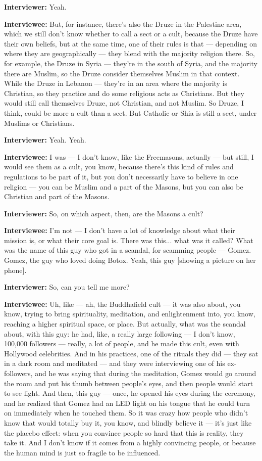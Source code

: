 \textbf{Interviewer:} Yeah.

\textbf{Interviewee:} But, for instance, there's also the Druze in the Palestine area, which we still don't know whether to call a sect or a cult, because the Druze have their own beliefs, but at the same time, one of their rules is that — depending on where they are geographically — they blend with the majority religion there. So, for example, the Druze in Syria — they're in the south of Syria, and the majority there are Muslim, so the Druze consider themselves Muslim in that context. While the Druze in Lebanon — they're in an area where the majority is Christian, so they practice and do some religious acts as Christians. But they would still call themselves Druze, not Christian, and not Muslim. So Druze, I think, could be more a cult than a sect. But Catholic or Shia is still a sect, under Muslims or Christians.

\textbf{Interviewer:} Yeah. Yeah.

\textbf{Interviewee:} I was — I don't know, like the Freemasons, actually — but still, I would see them as a cult, you know, because there's this kind of rules and regulations to be part of it, but you don't necessarily have to believe in one religion — you can be Muslim and a part of the Masons, but you can also be Christian and part of the Masons.

\textbf{Interviewer:} So, on which aspect, then, are the Masons a cult?

\textbf{Interviewee:} I'm not — I don't have a lot of knowledge about what their mission is, or what their core goal is. There was this... what was it called? What was the name of this guy who got in a scandal, for scamming people — Gomez. Gomez, the guy who loved doing Botox. Yeah, this guy [showing a picture on her phone].

\textbf{Interviewer:} So, can you tell me more?

\textbf{Interviewee:} Uh, like — ah, the Buddhafield cult — it was also about, you know, trying to bring spirituality, meditation, and enlightenment into, you know, reaching a higher spiritual space, or place. But actually, what was the scandal about, with this guy: he had, like, a really large following — I don't know, 100,000 followers — really, a lot of people, and he made this cult, even with Hollywood celebrities. And in his practices, one of the rituals they did — they sat in a dark room and meditated — and they were interviewing one of his ex-followers, and he was saying that during the meditation, Gomez would go around the room and put his thumb between people's eyes, and then people would start to see light. And then, this guy — once, he opened his eyes during the ceremony, and he realized that Gomez had an LED light on his tongue that he could turn on immediately when he touched them. So it was crazy how people who didn't know that would totally buy it, you know, and blindly believe it — it's just like the placebo effect: when you convince people so hard that this is reality, they take it. And I don't know if it comes from a highly convincing people, or because the human mind is just so fragile to be influenced.

